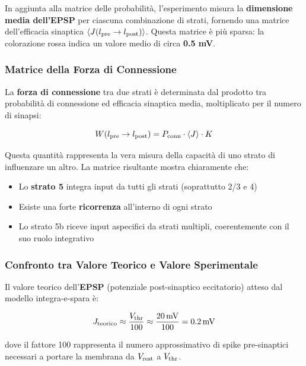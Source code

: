 In aggiunta alla matrice delle probabilità, l'esperimento misura la \textbf{dimensione media dell'EPSP} per ciascuna combinazione di strati, fornendo una matrice dell'efficacia sinaptica $\langle J(l_{\rm pre} \to l_{\rm post}) \rangle$. Questa matrice è più sparsa: la colorazione rossa indica un valore medio di circa \textbf{0.5 mV}.

\subsubsection{Matrice della Forza di Connessione}

La \textbf{forza di connessione} tra due strati è determinata dal prodotto tra probabilità di connessione ed efficacia sinaptica media, moltiplicato per il numero di sinapsi:

\begin{equation}
W(l_{\rm pre} \to l_{\rm post}) = P_{\rm conn} \cdot \langle J \rangle \cdot K
\end{equation}

Questa quantità rappresenta la vera misura della capacità di uno strato di influenzare un altro. La matrice risultante mostra chiaramente che:

\begin{itemize}
    \item Lo \textbf{strato 5} integra input da tutti gli strati (soprattutto 2/3 e 4)
    \item Esiste una forte \textbf{ricorrenza} all'interno di ogni strato
    \item Lo strato 5b riceve input aspecifici da strati multipli, coerentemente con il suo ruolo integrativo
\end{itemize}

\subsubsection{Confronto tra Valore Teorico e Valore Sperimentale}

Il valore teorico dell'\textbf{EPSP} (potenziale post-sinaptico eccitatorio) atteso dal modello integra-e-spara è:

\begin{equation}
J_{\rm teorico} \approx \frac{V_{\rm thr}}{100} \approx \frac{20\,\text{mV}}{100} = 0.2\,\text{mV}
\end{equation}

dove il fattore 100 rappresenta il numero approssimativo di spike pre-sinaptici necessari a portare la membrana da $V_{\rm rest}$ a $V_{\rm thr}$.

